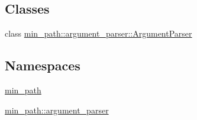 \subsection*{Classes}
\begin{DoxyCompactItemize}
\item 
class \hyperlink{a00002}{min\+\_\+path\+::argument\+\_\+parser\+::\+Argument\+Parser}
\end{DoxyCompactItemize}
\subsection*{Namespaces}
\begin{DoxyCompactItemize}
\item 
 \hyperlink{a00033}{min\+\_\+path}
\item 
 \hyperlink{a00034}{min\+\_\+path\+::argument\+\_\+parser}
\end{DoxyCompactItemize}
